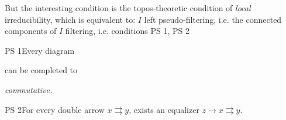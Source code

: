 But the interesting condition is the topos-theoretic condition of \textit{local} irreducibility, which is equivalent to: $I$ left pseudo-filtering, i.e. the connected components of $I$ filtering, i.e. conditions PS 1, PS 2

PS 1\enspace Every diagram  can be completed to  \textit{commutative.}

PS 2\enspace For every double arrow $x \rightrightarrows y$, exists an equalizer $z \longrightarrow x \rightrightarrows y$.